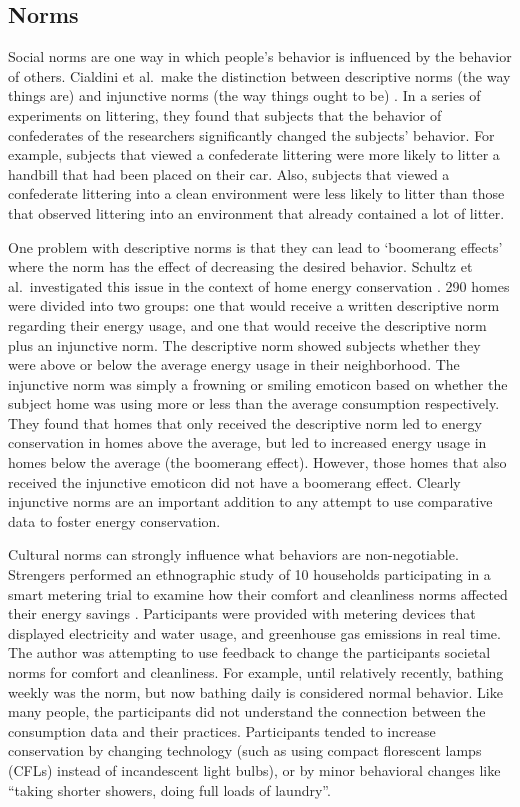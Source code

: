 \subsection{Norms}
\label{sec:norms}

Social norms are one way in which people's behavior is influenced by the behavior of others. Cialdini et al.\ make the distinction between descriptive norms (the way things are) and injunctive norms (the way things ought to be) \cite{Cialdini90}. In a series of experiments on littering, they found that subjects that the behavior of confederates of the researchers significantly changed the subjects' behavior. For example, subjects that viewed a confederate littering were more likely to litter a handbill that had been placed on their car. Also, subjects that viewed a confederate littering into a clean environment were less likely to litter than those that observed littering into an environment that already contained a lot of litter.

One problem with descriptive norms is that they can lead to `boomerang effects' where the norm has the effect of decreasing the desired behavior. Schultz et al.\ investigated this issue in the context of home energy conservation \cite{Schultz2007SocialNorms}. 290 homes were divided into two groups: one that would receive a written descriptive norm regarding their energy usage, and one that would receive the descriptive norm plus an injunctive norm. The descriptive norm showed subjects whether they were above or below the average energy usage in their neighborhood. The injunctive norm was simply a frowning or smiling emoticon based on whether the subject home was using more or less than the average consumption respectively. They found that homes that only received the descriptive norm led to energy conservation in homes above the average, but led to increased energy usage in homes below the average (the boomerang effect). However, those homes that also received the injunctive emoticon did not have a boomerang effect. Clearly injunctive norms are an important addition to any attempt to use comparative data to foster energy conservation.

Cultural norms can strongly influence what behaviors are non-negotiable. Strengers performed an ethnographic study of 10 households participating in a smart metering trial to examine how their comfort and cleanliness norms affected their energy savings \cite{strengers-comfort-norms-2008}. Participants were provided with metering devices that displayed electricity and water usage, and greenhouse gas emissions in real time. The author was attempting to use feedback to change the participants societal norms for comfort and cleanliness. For example, until relatively recently, bathing weekly was the norm, but now bathing daily is considered normal behavior. Like many people, the participants did not understand the connection between the consumption data and their practices. Participants tended to increase conservation by changing technology (such as using compact florescent lamps (CFLs) instead of incandescent light bulbs), or by minor behavioral changes like ``taking shorter showers, doing full loads of laundry''.

